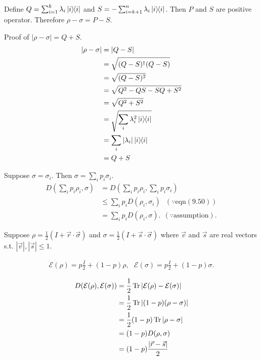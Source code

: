 Define $Q = \sum_{i=1}^k \lambda_i \ket{i}\hspace{-1mm} \bra{i}$ and $S = -\sum_{i=k+1}^{n} \lambda_i \ket{i}\hspace{-1mm} \bra{i}$.
Then $P$ and $S$ are positive operator. Therefore $\rho - \sigma = P - S$.

\begin{screen}
	Proof of $|\rho - \sigma| = Q + S$.
	\begin{align*}
		|\rho- \sigma| &= |Q - S|\\
			&= \sqrt{(Q-S)^\dagger (Q-S)}\\
			&= \sqrt{(Q-S)^2}\\
			&= \sqrt{Q^2 - QS - SQ + S^2}\\
			&= \sqrt{Q^2 + S^2}\\
			&= \sqrt{\sum_i \lambda_i^2 \ket{i}\hspace{-1mm} \bra{i}}\\
			&= \sum_i |\lambda_i| \ket{i}\hspace{-1mm} \bra{i}\\
			&= Q + S
	\end{align*}
\end{screen}


Suppose $\sigma = \sigma_i$. Then $\sigma = \sum_i p_i \sigma_i$.
\begin{align}
	D \left( \sum_i p_i \rho_i, \sigma\right) &= D \left( \sum_i p_i \rho_i, \sum_i p_i \sigma_i\right)\\
		&\leq \sum_i p_i D(\rho_i, \sigma_i) ~~~ (\because \text{eqn}(9.50))\\
		&= \sum_i p_i D(\rho_i, \sigma).~~(\because \text{assumption}).
\end{align}


Suppose $\rho = \frac{1}{2} (I + \vec{r}\cdot \vec{\sigma})$ and $\sigma = \frac{1}{2} (I + \vec{s}\cdot \vec{\sigma})$ where $\vec{v}$ and $\vec{s}$ are real vectors s.t. $|\vec{v}|, |\vec{s}| \leq 1$.

\begin{align*}
	\mathcal{E} (\rho) = p \frac{I}{2} + (1-p) \rho, ~~~
	\mathcal{E}(\sigma) = p \frac{I}{2} + (1-p) \sigma.
\end{align*}

\begin{align*}
	D(\mathcal{E}(\rho), \mathcal{E}(\sigma)) &= \frac{1}{2} \operatorname{Tr} |\mathcal{E}(\rho) -  \mathcal{E}(\sigma)|\\
		&= \frac{1}{2} \operatorname{Tr} |(1-p)(\rho - \sigma)|\\
		&= \frac{1}{2}(1-p) \operatorname{Tr} |\rho - \sigma|\\
		&= (1-p) D(\rho, \sigma)\\
		&= (1-p) \frac{|\vec{r} - \vec{s}|}{2}
\end{align*}

